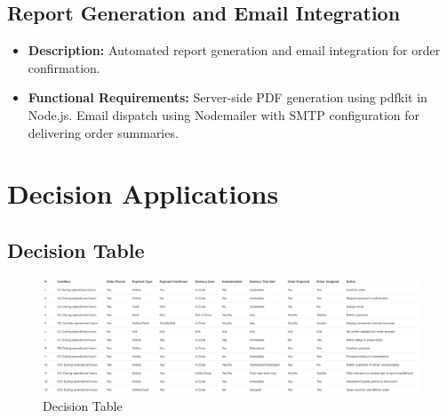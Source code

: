 \documentclass{article}
\begin{document}
\subsection{Report Generation and Email Integration}
\begin{itemize}
    \item \textbf{Description:} Automated report generation and email integration for order confirmation.
    \item \textbf{Functional Requirements:} Server-side PDF generation using pdfkit in Node.js. Email dispatch using Nodemailer with SMTP configuration for delivering order summaries.
\end{itemize}

\section{Decision Applications}


\subsection{Decision Table}
\begin{figure}[h!]
    \centering
    \includegraphics[width=\textwidth]{DecisionTable.png}
    \caption{Decision Table }
    \label{fig:decision_table}
\end{figure}
\end{document}
